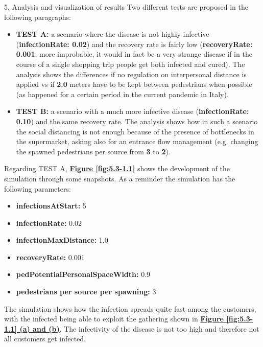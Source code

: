 \documentclass[10pt,a4paper]{article}
\begin{document}
\begin{task}{5, Analysis and visualization of results}
Two different tests are proposed in the following paragraphs:
\begin{itemize}
    \item \textbf{TEST A: }a scenario where the disease is not highly infective (\textbf{infectionRate: 0.02}) and the recovery rate is fairly low (\textbf{recoveryRate: 0.001}, more improbable, it would in fact be a very strange disease if in the course of a single shopping trip people get both infected and cured). The analysis shows the differences if no regulation on interpersonal distance is applied vs if \textbf{2.0} meters have to be kept between pedestrians when possible (as happened for a certain period in the current pandemic in Italy).
    \item \textbf{TEST B: }a scenario with a much more infective disease (\textbf{infectionRate: 0.10}) and the same recovery rate. The analysis shows how in such a scenario the social distancing is not enough because of the presence of bottlenecks in the supermarket, asking also for an entrance flow management (e.g. changing the spawned pedestrians per source from \textbf{3} to \textbf{2}).
\end{itemize}

Regarding TEST A, \textbf{\hyperref[fig:5.3-1.1]{Figure \ref{fig:5.3-1.1}}} shows the development of the simulation through some snapshots. As a reminder the simulation has the following parameters:
\begin{itemize}
    \item \textbf{infectionsAtStart:} 5
    \item \textbf{infectionRate:} 0.02
    \item \textbf{infectionMaxDistance:} 1.0
    \item \textbf{recoveryRate:} 0.001
    \item \textbf{pedPotentialPersonalSpaceWidth:} 0.9
    \item \textbf{pedestrians per source per spawning:} 3
\end{itemize}
The simulation shows how the infection spreads quite fast among the customers, with the infected being able to exploit the gathering shown in \textbf{\hyperref[fig:5.3-1.1]{Figure \ref{fig:5.3-1.1} (a) and (b)}}.
The infectivity of the disease is not too high and therefore not all customers get infected.


\end{task}
\end{document}
